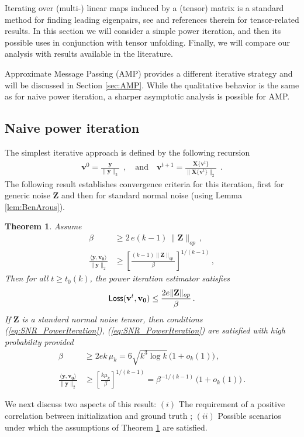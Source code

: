 \documentclass[11pt]{article}
\newtheorem{theorem}{Theorem}
\theoremstyle{definition}
\def\Loss{{\sf Loss}}
\def\<{\langle}
\def\>{\rangle}
\def\bv{\mathbf{v}}
\def\bvz{\mathbf{v_0}}
\def\bX{\mathbf{X}}
\def\bZ{\mathbf{Z}}
\def\by{{\mathbf y}}
\begin{document}
Iterating over (multi-) linear maps induced by a (tensor) matrix is a
standard method for finding leading eigenpairs, 
see \cite{kolda2011shifted} and references therein for tensor-related results.
In this section we will consider a simple power iteration, and then
its possible uses in conjunction with tensor unfolding.
Finally, we will compare our analysis with results available in the
literature.

Approximate Message Passing (AMP) provides a different iterative strategy
and will be discussed in Section  \ref{sec:AMP}. While the qualitative
behavior is the same as for naive power iteration, a sharper
asymptotic analysis is possible for AMP.

\subsection{Naive power iteration}

The simplest iterative approach  is defined by the following recursion
%
\begin{align}\tag*{Power Iteration}\label{eq:tensorPiter}
%
\bv^0= \frac{\by}{\|\by\|_2}~~,\quad\text{and}\quad \bv^{t+1} =  \frac{\bX\{\bv^t\} }{ \|
\bX\{\bv^t\} \|_2}~~.
%
\end{align}
%
The following result establishes convergence criteria for this
iteration, first for generic noise $\bZ$ and then for standard normal
noise (using Lemma \ref{lem:BenArous}).
%
\begin{theorem}\label{lem:powerIterationPositiveResult} 
Assume 
%
\begin{align}
%
\beta&\ge 2\,e (k-1)\, \|\bZ\|_{op}\,, \label{eq:SNR_PowerIteration}\\
\frac{\<\by ,\bvz\>}{\|\by\|_2} &\ge
\left[\frac{(k-1)\|\bZ\|_{op}}{\beta}\right]^{1/(k-1)}\, ,\label{eq:InitPowerIteration}
%
\end{align}
%
Then for all $t\ge t_0(k)$, the power iteration estimator satisfies 
%
\begin{align}
\Loss(\bv^t,\bvz) \le \frac{2e\|\bZ\|_{op}}{\beta}\, .\label{eq:BoundPI}
\end{align} 
%
If $\bZ$ is a standard normal noise tensor, then conditions
(\ref{eq:SNR_PowerIteration}), (\ref{eq:SNR_PowerIteration}) are
satisfied with high probability provided 
%
\begin{align}
%
\beta &\ge 2ek\, \mu_k  = 6\sqrt{k^3\log k} \, \big(1+o_k(1)\big)\, ,\label{eq:SNR_PowerIteration_BIS}\\
\frac{\<\by ,\bvz\>}{\|\by\|_2} &\ge
\left[\frac{k\mu_k}{\beta}\right]^{1/(k-1)} = \beta^{-1/(k-1)} \, \big(1+o_k(1)\big)\, .  \label{eq:InitPowerIteration_BIS}
%
\end{align}
%
\end{theorem}
%
We next discuss two aspects of this result: $(i)$ The requirement of a
positive correlation between initialization and ground truth ; $(ii)$
Possible scenarios under  which the assumptions of Theorem
\ref{lem:powerIterationPositiveResult}
are satisfied.
\end{document}
